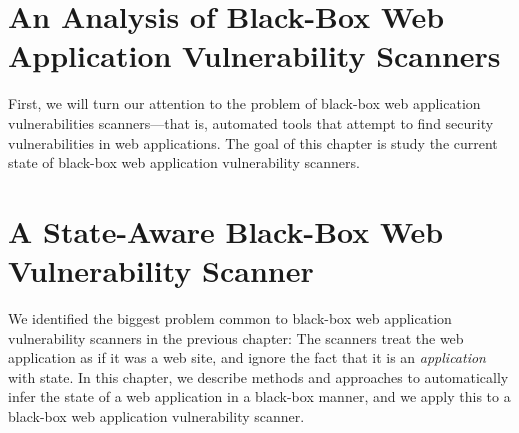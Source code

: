 \chapter{An Analysis of Black-Box Web Application Vulnerability Scanners}
\label{why-johnny-cant-pentest}

First, we will turn our attention to the problem of black-box web
application vulnerabilities scanners---that is, automated tools that
attempt to find security vulnerabilities in web applications. The goal
of this chapter is study the current state of black-box web
application vulnerability scanners. 
\\



\chapter{A State-Aware Black-Box Web Vulnerability Scanner}
\label{enemy-of-the-state}

We identified the biggest problem common to black-box web application
vulnerability scanners in the previous chapter: The scanners treat the
web application as if it was a web site, and ignore the fact that it
is an \emph{application} with state. In this chapter, we describe
methods and approaches to automatically infer the state of a web
application in a black-box manner, and we apply this to a black-box
web application vulnerability scanner.
\\

